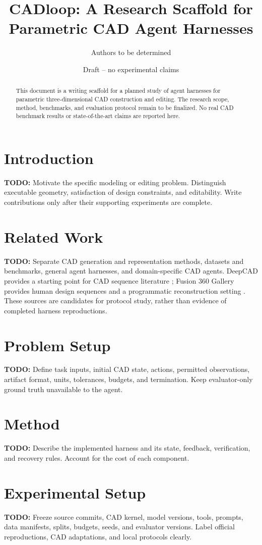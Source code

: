 \documentclass[11pt]{article}
\title{CADloop: A Research Scaffold for Parametric CAD Agent Harnesses}
\author{Authors to be determined}
\date{Draft -- no experimental claims}
\begin{document}
\maketitle

\begin{abstract}
This document is a writing scaffold for a planned study of agent harnesses
for parametric three-dimensional CAD construction and editing. The research
scope, method, benchmarks, and evaluation protocol remain to be finalized.
No real CAD benchmark results or state-of-the-art claims are reported here.
\end{abstract}

\section{Introduction}
\textbf{TODO:} Motivate the specific modeling or editing problem. Distinguish
executable geometry, satisfaction of design constraints, and editability.
Write contributions only after their supporting experiments are complete.

\section{Related Work}
\textbf{TODO:} Separate CAD generation and representation methods, datasets
and benchmarks, general agent harnesses, and domain-specific CAD agents.
DeepCAD provides a starting point for CAD sequence literature
\cite{wu2021deepcad}; Fusion 360 Gallery provides human design sequences and
a programmatic reconstruction setting \cite{willis2021fusion}.
These sources are candidates for protocol study, rather than evidence of
completed harness reproductions.

\section{Problem Setup}
\textbf{TODO:} Define task inputs, initial CAD state, actions, permitted
observations, artifact format, units, tolerances, budgets, and termination.
Keep evaluator-only ground truth unavailable to the agent.

\section{Method}
\textbf{TODO:} Describe the implemented harness and its state, feedback,
verification, and recovery rules. Account for the cost of each component.

\section{Experimental Setup}
\textbf{TODO:} Freeze source commits, CAD kernel, model versions, tools,
prompts, data manifests, splits, budgets, seeds, and evaluator versions.
Label official reproductions, CAD adaptations, and local protocols clearly.
\end{document}
